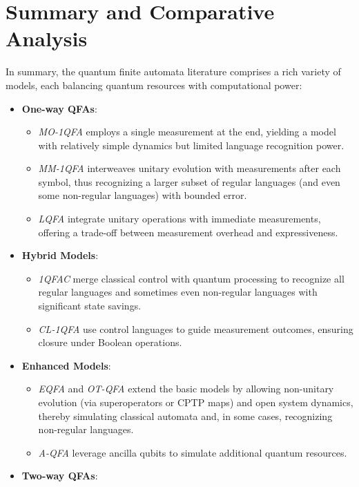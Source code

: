 
\section{Summary and Comparative Analysis}
\label{sec:summary-comparative}

In summary, the quantum finite automata literature comprises a rich variety of models, each balancing quantum resources with computational power:
\begin{itemize}
    \item \textbf{One-way QFAs}:  
    \begin{itemize}
        \item \textit{MO-1QFA} employs a single measurement at the end, yielding a model with relatively simple dynamics but limited language recognition power.
        \item \textit{MM-1QFA} interweaves unitary evolution with measurements after each symbol, thus recognizing a larger subset of regular languages (and even some non-regular languages) with bounded error.
        \item \textit{LQFA} integrate unitary operations with immediate measurements, offering a trade-off between measurement overhead and expressiveness.
    \end{itemize}
    \item \textbf{Hybrid Models}:  
    \begin{itemize}
        \item \textit{1QFAC} merge classical control with quantum processing to recognize all regular languages and sometimes even non-regular languages with significant state savings.
        \item \textit{CL-1QFA} use control languages to guide measurement outcomes, ensuring closure under Boolean operations.
    \end{itemize}
    \item \textbf{Enhanced Models}:  
    \begin{itemize}
        \item \textit{EQFA} and \textit{OT-QFA} extend the basic models by allowing non-unitary evolution (via superoperators or CPTP maps) and open system dynamics, thereby simulating classical automata and, in some cases, recognizing non-regular languages.
        \item \textit{A-QFA} leverage ancilla qubits to simulate additional quantum resources.
    \end{itemize}
    \item \textbf{Two-way QFAs}:  

\end{itemize}
